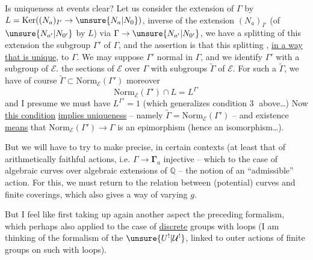  Is uniqueness at  events clear?
 Let us consider the extension  of
$\Gamma$ by $L=\mathrm{Ker}((N_a)_{I'}\to\unsure{N_a|N_0})$,
inverse  of the extension $(N_a)_{I'}$
(of $\unsure{N_{a'}|N_{0'}}$ by $L$) via $\Gamma\to\unsure{N_{a'}|N_{0'}}$, we
have a  splitting of this extension 
the subgroup $\Gamma'$ of $\Gamma$, and the assertion is
that this splitting \uline{}, \uline{in a way} \uline{that is unique}, to $\Gamma$.
We may suppose $\Gamma'$ normal in $\Gamma$, and we
identify $\Gamma'$ with a subgroup of $\mathcal{E}$. 
 the sections of $\mathcal{E}$ over $\Gamma$ 
with  subgroups $\widetilde{\Gamma}$ of $\mathcal{E}$.
For such a $\widetilde{\Gamma}$, we have of course
$\widetilde{\Gamma}\subset\mathrm{Norm}_{\mathcal{E}}(\Gamma')$
moreover  
\[
\mathrm{Norm}_{\mathcal{E}}(\Gamma')\cap L=L^{\Gamma'} \tag{31}
\]
and I presume we must have
$L^{\Gamma'}=1$ (which generalizes condition
\textcircled{3} above\ldots) Now \uline{this condition}
\uline{implies uniqueness} -- namely
$\widetilde{\Gamma}=\mathrm{Norm}_{\mathcal{E}}(\Gamma')$ --
and existence \uline{means} that
$\mathrm{Norm}_{\mathcal{E}}(\Gamma')\to\Gamma$
is an epimorphism (hence an isomorphism\ldots).

But we will have to try to make precise,
in certain contexts (at least that of
arithmetically faithful actions, i.e. $\Gamma\to\boldsymbol{\Gamma}_a$
injective -- which  
to the case of algebraic curves  over
algebraic extensions of $\mathbb{Q}$ -- the notion
of an ``admissible'' action. For this, we
must return to the relation between
(potential) curves and finite coverings,
which also gives a way of
varying $g$.

But I feel like first taking up again
 another aspect  the preceding
formalism, which  perhaps also  applied to the case of \uline{discrete} groups
with loops (I am thinking of the formalism
of the $\unsure{U^!|\mathcal{U}^!}$, linked to outer actions of
finite groups on such  with loops).

